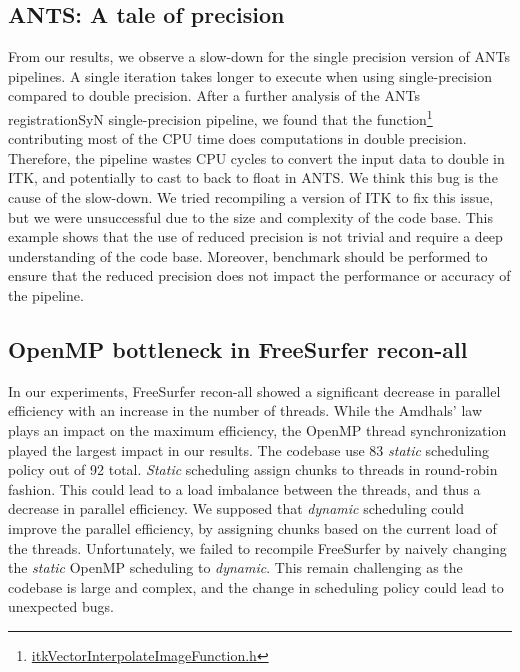 \documentclass[conference]{IEEEtran}
\begin{document}
\subsection{ANTS: A tale of precision}
From our results, we observe a slow-down for the single precision version of ANTs pipelines. A single iteration takes longer to execute when using single-precision compared to double precision. After a further analysis of the ANTs registrationSyN single-precision pipeline, we found that the function\footnote{\href{https://github.com/InsightSoftwareConsortium/ITK/blob/d9c585d96359bf304ad3047148cee81bf27ac0c1/Modules/Core/ImageFunction/include/itkVectorInterpolateImageFunction.h\#L46-L48}{itkVectorInterpolateImageFunction.h}} contributing most of the CPU time does computations in double precision. Therefore, the pipeline wastes CPU cycles to convert the input data to double in ITK, and potentially to cast to back to float in ANTS. We think this bug is the cause of the slow-down. We tried recompiling a version of ITK to fix this issue, but we were unsuccessful due to the size and complexity of the code base. This example shows that the use of reduced precision is not trivial and require a deep understanding of the code base. Moreover, benchmark should be performed to ensure that the reduced precision does not impact the performance or accuracy of the pipeline.

\subsection{OpenMP bottleneck in FreeSurfer recon-all}
In our experiments, FreeSurfer recon-all showed a significant decrease in parallel efficiency with an increase in the number of threads. While the Amdhals' law plays an impact on the maximum efficiency, the OpenMP thread synchronization played the largest impact in our results. The codebase use 83 \textit{static} scheduling policy out of 92 total. \textit{Static} scheduling assign chunks to threads in round-robin fashion. This could lead to a load imbalance between the threads, and thus a decrease in parallel efficiency. We supposed that \textit{dynamic} scheduling could improve the parallel efficiency, by assigning chunks based on the current load of the threads. Unfortunately, we failed to recompile FreeSurfer by naively changing the \textit{static} OpenMP scheduling to \textit{dynamic}. This remain challenging as the codebase is large and complex, and the change in scheduling policy could lead to unexpected bugs.
			
\end{document}
